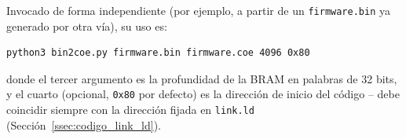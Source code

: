 Invocado de forma independiente (por ejemplo, a partir de un
\texttt{firmware.bin} ya generado por otra vía), su uso es:
\begin{lstlisting}[style=bashstyle]
    python3 bin2coe.py firmware.bin firmware.coe 4096 0x80
\end{lstlisting}
donde el tercer argumento es la profundidad de la BRAM en palabras de 32
bits, y el cuarto (opcional, \texttt{0x80} por defecto) es la dirección
de inicio del código -- debe coincidir siempre con la dirección fijada en
\texttt{link.ld} (Sección~\ref{ssec:codigo_link_ld}).
